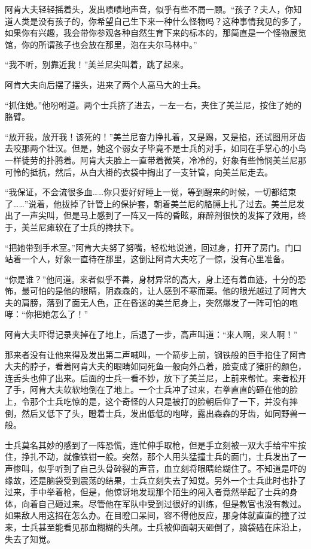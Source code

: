 阿肯大夫轻轻摇着头，发出啧啧地声音，似乎有些不屑一顾。“孩子？夫人，你知道人类是没有孩子的，你希望自己生下来一种什么怪物吗？这种事情我见的多了，如果你有兴趣，我会带你参观各种自然生育下来的标本的，那简直是一个怪物展览馆，你的所谓孩子也会放在那里，泡在夫尔马林中。”

“我不听，别靠近我！”美兰尼尖叫着，跳了起来。

阿肯大夫向后摆了摆头，进来了两个人高马大的士兵。

“抓住她。”他吩咐道。两个士兵挤了进去，一左一右，夹住了美兰尼，按住了她的胳臂。

“放开我，放开我！该死的！”美兰尼奋力挣扎着，又是踢，又是掐，还试图用牙齿去咬那两个壮汉。但是，她这个弱女子毕竟不是士兵的对手，如同在手掌心的小鸟一样徒劳的扑腾着。阿肯大夫脸上一直带着微笑，冷冷的，好象有些怜悯美兰尼那可怜的抵抗，然后，从白大褂的衣袋中掏出了一支针管，向美兰尼走去。

“我保证，不会流很多血……你只要好好睡上一觉，等到醒来的时候，一切都结束了……”说着，他拔掉了针管上的保护套，朝着美兰尼的胳膊上扎了过去。美兰尼发出了一声尖叫，但是马上感到了一阵又一阵的昏眩，麻醉剂很快的发挥了效用，终于，美兰尼瘫软在了士兵的搀扶下。

“把她带到手术室。”阿肯大夫努了努嘴，轻松地说道，回过身，打开了房门。门口站着一个人，好象一直待在那里，这倒让阿肯大夫吃了一惊，没有心里准备。

“你是谁？”他问道。来者似乎不善，身材异常的高大，身上还有着血迹，十分的恐怖，最可怕的是他的眼睛，阴森森的，让人感到不寒而栗。他的眼光越过了阿肯大夫的肩膀，落到了面无人色，正在昏迷的美兰尼身上，突然爆发了一阵可怕的咆哮：“你把她怎么了！”

阿肯大夫吓得记录夹掉在了地上，后退了一步，高声叫道：“来人啊，来人啊！”

那来者没有让他来得及发出第二声喊叫，一个箭步上前，钢铁般的巨手掐住了阿肯大夫的脖子，看着阿肯大夫的眼睛如同死鱼一般向外凸着，脸变成了猪肝的颜色，连舌头也伸了出来。后面的士兵一看不妙，放下了美兰尼，上前来帮忙。来者松开了手，阿肯大夫软软地倒在了地上。一个士兵冲了过来，右拳直直的砸在他的脸上，令那个士兵吃惊的是，这个奇怪的人只是被打的脸朝后仰了一下，并没有摔倒，然后又低下了头，瞪着士兵，发出低低的咆哮，露出森森的牙齿，如同野兽一般。

士兵莫名其妙的感到了一阵恐慌，连忙伸手取枪，但是手立刻被一双大手给牢牢按住，挣扎不动，就像铁钳一般。突然，那个人用头猛撞士兵的面门，士兵发出了一声惨叫，似乎听到了自己头骨碎裂的声音，血立刻将眼睛给糊住了。不知道是吓的缘故，还是脑袋受到震荡的结果，士兵立刻失去了知觉。另外一个士兵此时也扑了过来，手中举着枪，但是，他惊讶地发现那个陌生的闯入者竟然举起了士兵的身体，向着自己砸过来。尽管他在军队中受到过很好的训练，但是教官也没有教过。如果敌人用这招在怎么办。在目瞪口呆间，容不得他反应，那身体就直直的撞了过来，士兵甚至能看见那血糊糊的头颅。士兵被仰面朝天砸倒了，脑袋磕在床沿上，失去了知觉。

